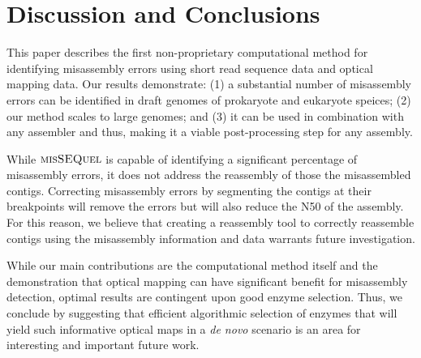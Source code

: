 \section{Discussion and Conclusions} \label{sec:discussion} 

This paper describes the first non-proprietary computational method for identifying misassembly errors using short read sequence data and optical mapping data.
 Our results demonstrate: (1) a substantial number of misassembly errors can be identified in draft genomes of prokaryote and eukaryote speices; (2) our method scales to large genomes; and (3) it can be used in combination with any
 assembler and thus, making it a viable post-processing step for any assembly. 

While $\mbox{\rm {\sc misSEQuel}}$ is capable of identifying a significant percentage of misassembly errors, it does not address 
the reassembly of those the misassembled contigs. 
Correcting misassembly errors by segmenting the contigs at their breakpoints will remove the errors but will also 
reduce
the N50 
of the assembly.  
For this reason, we believe that creating a reassembly tool to correctly reassemble contigs using the misassembly information and data warrants future investigation.

While our main contributions are the computational method itself and the demonstration that optical mapping can have significant benefit for misassembly detection, optimal results are contingent upon good enzyme selection. 
Thus, we conclude by suggesting that efficient algorithmic selection of enzymes that will yield such informative optical maps in a {\em de novo} scenario is an area for interesting and important future work.  








